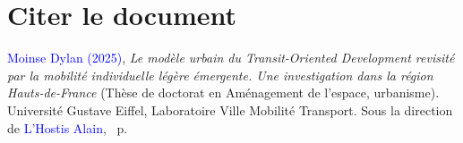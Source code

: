 
\cleardoublepage
\section*{Citer le document
    \label{body:citer-document}
    }

\small{\textcolor{blue}{Moinse Dylan (2025)}, \textsl{Le modèle urbain du Transit-Oriented Development revisité par la mobilité individuelle légère émergente. Une investigation dans la région Hauts-de-France} (Thèse de doctorat en Aménagement de l'espace, urbanisme). Université Gustave Eiffel, Laboratoire Ville Mobilité Transport. Sous la direction de \textcolor{blue}{L'Hostis Alain}, \pageref{LastPage}~p.}
